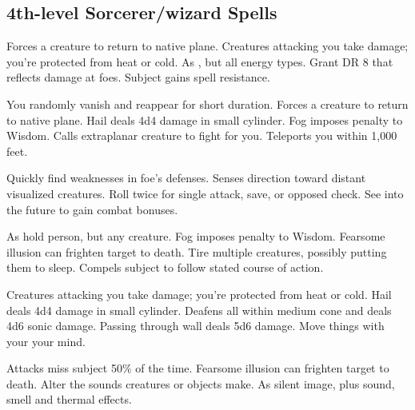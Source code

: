 \subsection{4th-level Sorcerer/wizard Spells} 
\begin{swspelllist}
   Forces a creature to return to native plane.
   Creatures attacking you take damage; you're protected from heat or cold.   As , but all energy types.
   Grant DR 8 that reflects damage at foes.
   Subject gains spell resistance.

   You randomly vanish and reappear for short duration.
   Forces a creature to return to native plane.
   Hail deals 4d4 damage in small cylinder.
   Fog imposes  penalty to Wisdom.
   Calls extraplanar creature to fight for you.
   Teleports you within 1,000 feet.

   Quickly find weaknesses in foe's defenses.
   Senses direction toward distant visualized creatures.
   Roll twice for single attack, save, or opposed check.
   See into the future to gain combat bonuses.

   As hold person, but any creature.
   Fog imposes  penalty to Wisdom.
   Fearsome illusion can frighten target to death.
   Tire multiple creatures, possibly putting them to sleep.
   Compels subject to follow stated course of action.

   Creatures attacking you take damage; you're protected from heat or cold.
   Hail deals 4d4 damage in small cylinder.
   Deafens all within medium cone and deals 4d6 sonic damage.
   Passing through wall deals 5d6 damage.
   Move things with your your mind.

   Attacks miss subject 50\% of the time.
   Fearsome illusion can frighten target to death.
   Alter the sounds creatures or objects make.
   As silent image, plus sound, smell and thermal effects.


\end{swspelllist}

